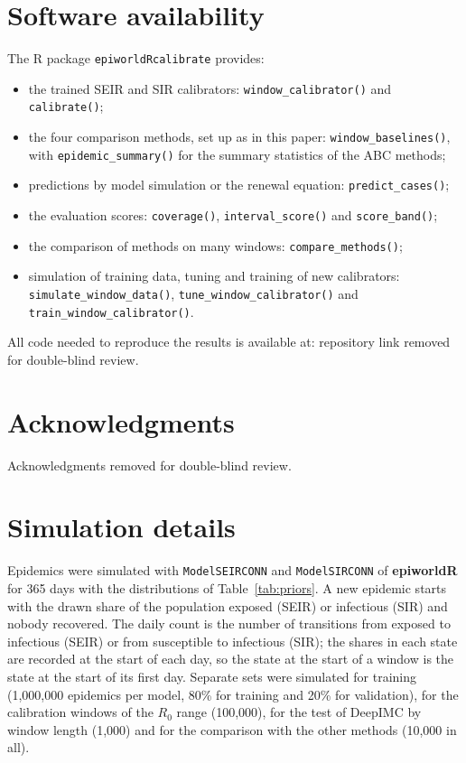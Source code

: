 \documentclass[12pt]{article}
\begin{document}
\section{Software availability}

The R package \texttt{epiworldRcalibrate} provides:
\begin{itemize}
\item the trained SEIR and SIR calibrators: \texttt{window\_calibrator()} and \texttt{calibrate()};
\item the four comparison methods, set up as in this paper: \texttt{window\_baselines()}, with
\texttt{epidemic\_summary()} for the summary statistics of the ABC methods;
\item predictions by model simulation or the renewal equation: \texttt{predict\_cases()};
\item the evaluation scores: \texttt{coverage()}, \texttt{interval\_score()} and \texttt{score\_band()};
\item the comparison of methods on many windows: \texttt{compare\_methods()};
\item simulation of training data, tuning and training of new calibrators:
  \texttt{simulate\_window\_data()}, \texttt{tune\_window\_calibrator()} and
  \texttt{train\_window\_calibrator()}.
\end{itemize}
All code needed to reproduce the results is available at: repository link removed for double-blind review.

\section*{Acknowledgments}
Acknowledgments removed for double-blind review.

\printbibliography

\appendix

\section{Simulation details}\label{sec:sim-parameters}

Epidemics were simulated with \texttt{ModelSEIRCONN} and \texttt{ModelSIRCONN} of \textbf{epiworldR} for
365 days with the distributions of Table~\ref{tab:priors}. A new epidemic starts with the drawn share of
the population exposed (SEIR) or infectious (SIR) and nobody recovered. The daily count is the number of
transitions from exposed to infectious (SEIR) or from susceptible to infectious (SIR); the shares in each
state are recorded at the start of each day, so the state at the start of a window is the state at the
start of its first day. Separate sets were simulated for training (1,000,000 epidemics per model, 80\% for
training and 20\% for validation), for the calibration windows of the $R_0$ range (100,000), for the test
of DeepIMC by window length (1,000) and for the comparison with the other methods (10,000 in all).
\end{document}
